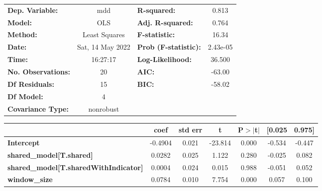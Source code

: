 \begin{center}
\begin{tabular}{lclc}
\toprule
\textbf{Dep. Variable:}                       &       mdd        & \textbf{  R-squared:         } &     0.813   \\
\textbf{Model:}                               &       OLS        & \textbf{  Adj. R-squared:    } &     0.764   \\
\textbf{Method:}                              &  Least Squares   & \textbf{  F-statistic:       } &     16.34   \\
\textbf{Date:}                                & Sat, 14 May 2022 & \textbf{  Prob (F-statistic):} &  2.43e-05   \\
\textbf{Time:}                                &     16:27:17     & \textbf{  Log-Likelihood:    } &    36.500   \\
\textbf{No. Observations:}                    &          20      & \textbf{  AIC:               } &    -63.00   \\
\textbf{Df Residuals:}                        &          15      & \textbf{  BIC:               } &    -58.02   \\
\textbf{Df Model:}                            &           4      & \textbf{                     } &             \\
\textbf{Covariance Type:}                     &    nonrobust     & \textbf{                     } &             \\
\bottomrule
\end{tabular}
\begin{tabular}{lcccccc}
                                              & \textbf{coef} & \textbf{std err} & \textbf{t} & \textbf{P$> |$t$|$} & \textbf{[0.025} & \textbf{0.975]}  \\
\midrule
\textbf{Intercept}                            &      -0.4904  &        0.021     &   -23.814  &         0.000        &       -0.534    &       -0.447     \\
\textbf{shared\_model[T.shared]}              &       0.0282  &        0.025     &     1.122  &         0.280        &       -0.025    &        0.082     \\
\textbf{shared\_model[T.sharedWithIndicator]} &       0.0004  &        0.024     &     0.015  &         0.988        &       -0.051    &        0.052     \\
\textbf{window\_size}                         &       0.0784  &        0.010     &     7.754  &         0.000        &        0.057    &        0.100     \\

\end{tabular}
\end{center}
